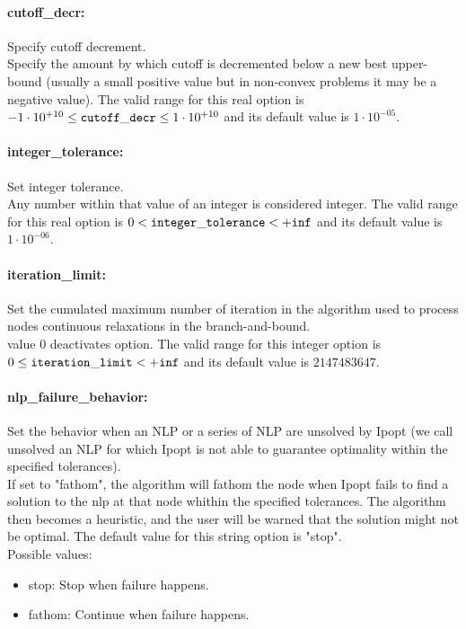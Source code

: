 \paragraph{cutoff\_decr:} Specify cutoff decrement. $\;$ \\
 Specify the amount by which cutoff is decremented
below a new best upper-bound (usually a small
positive value but in non-convex problems it may
be a negative value). The valid range for this real option is 
$-1 \cdot 10^{+10} \le {\tt cutoff\_decr } \le 1 \cdot 10^{+10}$
and its default value is $1 \cdot 10^{-05}$.


\paragraph{integer\_tolerance:} Set integer tolerance. $\;$ \\
 Any number within that value of an integer is
considered integer. The valid range for this real option is 
$0 <  {\tt integer\_tolerance } <  {\tt +inf}$
and its default value is $1 \cdot 10^{-06}$.


\paragraph{iteration\_limit:} Set the cumulated maximum number of iteration in the algorithm used to process nodes continuous relaxations in the branch-and-bound. $\;$ \\
 value 0 deactivates option. The valid range for this integer option is
$0 \le {\tt iteration\_limit } <  {\tt +inf}$
and its default value is $2147483647$.


\paragraph{nlp\_failure\_behavior:} Set the behavior when an NLP or a series of NLP are unsolved by Ipopt (we call unsolved an NLP for which Ipopt is not able to guarantee optimality within the specified tolerances). $\;$ \\
 If set to "fathom", the algorithm will fathom the
node when Ipopt fails to find a solution to the
nlp at that node whithin the specified
tolerances. The algorithm then becomes a
heuristic, and the user will be warned that the
solution might not be optimal.
The default value for this string option is "stop".
\\ 
Possible values:
\begin{itemize}
   \item stop: Stop when failure happens.
   \item fathom: Continue when failure happens.
\end{itemize}

